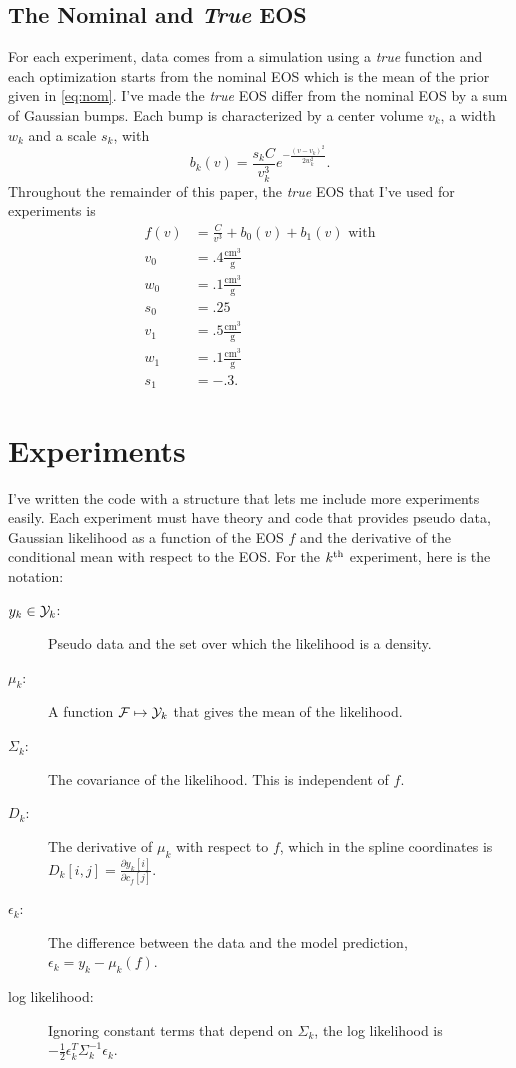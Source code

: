 \documentclass[11pt]{article}
\newcommand{\eos}{f}
\newcommand{\EOS}{{\cal F}}
\newcommand{\data}{y}
\newcommand{\DATA}{{\cal Y}}
\newcommand\cf{c_f}
\begin{document}
\subsection{The Nominal and \emph{True} EOS}
\label{sec:true-eos}

For each experiment, data comes from a simulation using a \emph{true}
function and each optimization starts from the nominal EOS which is
the mean of the prior given in \eqref{eq:nom}.  I've made the
\emph{true} EOS differ from the nominal EOS by a sum of Gaussian
bumps.  Each bump is characterized by a center volume $v_k$, a width
$w_k$ and a scale $s_k$, with
\begin{equation*}
  b_k(v) = \frac{s_k C}{v_k^3} e^{- \frac{(v-v_k)^2}{2w_k^2}}.
\end{equation*}
Throughout the remainder of this paper, the \emph{true} EOS that I've
used for experiments is
\begin{align}
  \label{eq:actual}
  f(v) &= \frac{C}{v^3} + b_0(v) + b_1(v) \text{ with} \\
  v_0 &= .4 \frac{\text{cm}^3}{\text{g}} \nonumber \\
  w_0 &= .1 \frac{\text{cm}^3}{\text{g}} \nonumber \\
  s_0 &= .25 \nonumber \\
  v_1 &= .5 \frac{\text{cm}^3}{\text{g}} \nonumber \\
  w_1 &= .1 \frac{\text{cm}^3}{\text{g}} \nonumber \\
  s_1 &= -.3 \nonumber.
\end{align}

\section{Experiments}
\label{sec:experiments}

I've written the code with a structure that lets me include more
experiments easily.  Each experiment must have theory and code that
provides pseudo data, Gaussian likelihood as a function of the EOS
$\eos$ and the derivative of the conditional mean with respect to the
EOS.  For the $k^{\rm th}$ experiment, here is the notation:
\begin{description}
\item[$\data_k\in \DATA_k$:] Pseudo data and the set over which the
  likelihood is a density.
\item[$\mu_k$:] A function $\EOS\mapsto \DATA_k$ that gives the mean
  of the likelihood.
\item[$\Sigma_k$:] The covariance of the likelihood.  This is
  independent of $\eos$.
\item[$D_k$:] The derivative of $\mu_k$ with respect to $\eos$, which
  in the spline coordinates is
  $D_k[i,j] =\frac{\partial \data_k[i]}{\partial \cf[j]}$.
\item[$\epsilon_k$:] The difference between the data and the model
  prediction, $\epsilon_k = \data_k - \mu_k(\eos)$.
\item[log likelihood:] Ignoring constant terms that depend on
  $\Sigma_k$, the log likelihood is $-\frac{1}{2}\epsilon_k^T
  \Sigma_k^{-1} \epsilon_k$.
\end{description}
\end{document}
